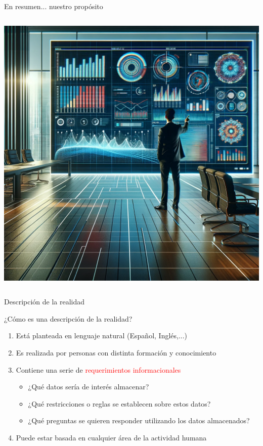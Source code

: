 \begin{frame}{En resumen... nuestro prop\'osito}
\begin{columns}
            \includegraphics[width=\linewidth]{img/presenting-data.png}
        
    \end{columns}

\end{frame}

\begin{frame}{Descripci\'on de la realidad}
    \begin{block}{¿C\'omo es una descripci\'on de la realidad?}
        \begin{enumerate}
            \item<2-> Est\'a planteada en lenguaje natural (Espa\~nol, Ingl\'es,...)
            \item<3-> Es realizada por personas con distinta formaci\'on y conocimiento
            \item<4-> Contiene una serie de \textcolor{red}{requerimientos informacionales} \begin{itemize}
                \item<5-> ¿Qu\'e datos ser\'ia de inter\'es almacenar?
                \item<6-> ¿Qu\'e restricciones o reglas se establecen sobre estos datos?
                \item<7-> ¿Qu\'e preguntas se quieren responder utilizando los datos almacenados?
            \end{itemize}
            \item<8-> Puede estar basada en cualquier \'area de la actividad humana
        \end{enumerate}
        
    \end{block}
\end{frame}